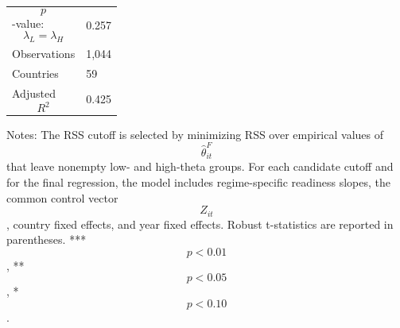 \begin{table}[H]
\begin{threeparttable}
\begin{tabularx}{\textwidth}{lY}
$$p$$-value: $$\lambda_L=\lambda_H$$ & 0.257 \\
Observations & 1,044 \\
Countries & 59 \\
Adjusted $$R^2$$ & 0.425 \\
\bottomrule
\end{tabularx}
\begin{tablenotes}[flushleft]\footnotesize
\item Notes: The RSS cutoff is selected by minimizing RSS over empirical values of $$\widehat{\theta}^{F}_{it}$$ that leave nonempty low- and high-theta groups. For each candidate cutoff and for the final regression, the model includes regime-specific readiness slopes, the common control vector $$Z_{it}$$, country fixed effects, and year fixed effects. Robust t-statistics are reported in parentheses. *** $$p<0.01$$, ** $$p<0.05$$, * $$p<0.10$$.
\end{tablenotes}
\end{threeparttable}
\end{table}
